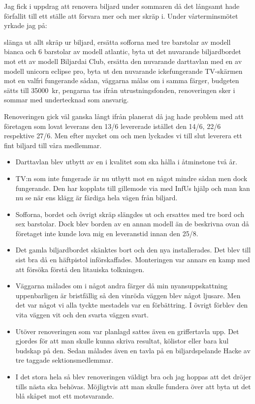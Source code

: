 \documentclass[../_main/handlingar.tex]{subfiles}
\begin{document}

    Jag fick i uppdrag att renovera biljard under sommaren då det långsamt hade förfallit till ett ställe att förvara mer och mer skräp i. Under vårterminsmötet yrkade jag på:

\begin{attsatser}
    \att slänga ut allt skräp ur biljard,
    \att ersätta sofforna med tre barstolar av modell bianca och 6 barstolar av modell atlantic,
    \att byta ut det nuvarande biljardbordet mot ett av modell Biljardai Club,
    \att ersätta den nuvarande darttavlan med en av modell unicorn eclipse pro,
    \att byta ut den nuvarande ickefungerande TV-skärmen mot en valfri fungerande sådan,
    \att väggarna målas om i samma färger,
    \att budgeten sätts till \SI{35000}{kr},
    \att pengarna tas ifrån utrustningsfonden,
    \att renoveringen sker i sommar med undertecknad som ansvarig.
\end{attsatser} 

Renoveringen gick väl ganska långt ifrån planerat då jag hade problem med att företagen
som lovat leverans den 13/6 levererade istället den 14/6, 22/6 respektive 27/6. Men efter
mycket om och men lyckades vi till slut leverera ett fint biljard till våra medlemmar.

\begin{itemize}
  \item Darttavlan blev utbytt av en i kvalitet som ska hålla i åtminstone två år.
  \item TV:n som inte fungerade är nu utbytt mot en något mindre sådan men dock fungerande. Den har kopplats till gillemode via med InfUs hjälp och man kan nu se när ens klägg är färdiga hela vägen från biljard.
  \item Sofforna, bordet och övrigt skräp slängdes ut och ersattes med tre bord och sex barstolar. Dock blev borden av en annan modell än de beskrivna ovan då företaget inte kunde lova mig en leveranstid innan den 25/8.
\item Det gamla biljardbordet skänktes bort och den nya installerades. Det blev till sist bra då en häftpistol införskaffades. Monteringen var annars en kamp med att försöka förstå den litauiska tolkningen.
\item Väggarna målades om i något andra färger då min nyansuppskattning uppenbarligen är bristfällig så den vinröda väggen blev något ljusare. Men det var något vi alla tyckte mestadels var en förbättring. I övrigt förblev den vita väggen vit och den svarta väggen svart.
\item Utöver renoveringen som var planlagd sattes även en griffertavla upp. Det gjordes för att man skulle kunna skriva resultat, kölistor eller bara kul budskap på den. Sedan målades även en tavla på en biljardspelande Hacke av tre taggade sektionsmedlemmar.
\item I det stora hela så blev renoveringen väldigt bra och jag hoppas att det dröjer tills nästa ska behövas. Möjligtvis att man skulle fundera över att byta ut det blå skåpet mot ett motsvarande.
\end{itemize}
\end{document}
